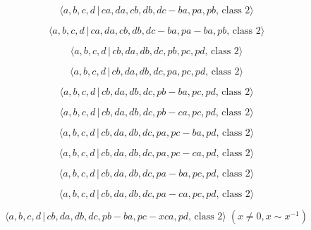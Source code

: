 \documentclass[10pt]{article}
\begin{document}
\begin{equation}
\langle a,b,c,d\,|\,ca,da,cb,db,dc-ba,pa,pb,\,\text{class }2\rangle 
\tag{7.2959}
\end{equation}

\begin{equation}
\langle a,b,c,d\,|\,ca,da,cb,db,dc-ba,pa-ba,pb,\,\text{class }2\rangle 
\tag{7.2960}
\end{equation}

\begin{equation}
\langle a,b,c,d\,|\,cb,da,db,dc,pb,pc,pd,\,\text{class }2\rangle 
\tag{7.2961}
\end{equation}

\begin{equation}
\langle a,b,c,d\,|\,cb,da,db,dc,pa,pc,pd,\,\text{class }2\rangle 
\tag{7.2962}
\end{equation}

\begin{equation}
\langle a,b,c,d\,|\,cb,da,db,dc,pb-ba,pc,pd,\,\text{class }2\rangle 
\tag{7.2963}
\end{equation}

\begin{equation}
\langle a,b,c,d\,|\,cb,da,db,dc,pb-ca,pc,pd,\,\text{class }2\rangle 
\tag{7.2964}
\end{equation}

\begin{equation}
\langle a,b,c,d\,|\,cb,da,db,dc,pa,pc-ba,pd,\,\text{class }2\rangle 
\tag{7.2965}
\end{equation}

\begin{equation}
\langle a,b,c,d\,|\,cb,da,db,dc,pa,pc-ca,pd,\,\text{class }2\rangle 
\tag{7.2966}
\end{equation}

\begin{equation}
\langle a,b,c,d\,|\,cb,da,db,dc,pa-ba,pc,pd,\,\text{class }2\rangle 
\tag{7.2967}
\end{equation}

\begin{equation}
\langle a,b,c,d\,|\,cb,da,db,dc,pa-ca,pc,pd,\,\text{class }2\rangle 
\tag{7.2968}
\end{equation}

\begin{equation}
\langle a,b,c,d\,|\,cb,da,db,dc,pb-ba,pc-xca,pd,\,\text{class }2\rangle \;(x
\neq 0, x \sim x^{-1})  \tag{7.2969}
\end{equation}
\end{document}
